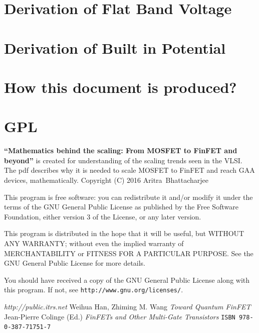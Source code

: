 \documentclass[a4paper]{article}
\begin{document}
\pagebreak

\begin{appendices}
  \section{Derivation of Flat Band Voltage}
  \section{Derivation of Built in Potential}
  \section{How this document is produced?}
  \section{GPL}

  \textbf{``Mathematics behind the scaling: From MOSFET to FinFET and beyond''} is created for understanding of the scaling trends seen in the VLSI. The pdf describes why it is needed to scale MOSFET to FinFET and reach GAA devices, mathematically.
  Copyright (C) 2016 Aritra~Bhattacharjee

  This program is free software: you can redistribute it and/or modify it under the terms of the GNU General Public License as published by the Free Software Foundation, either version 3 of the License, or any later version.

  This program is distributed in the hope that it will be useful, but WITHOUT ANY WARRANTY; without even the implied warranty of MERCHANTABILITY or FITNESS FOR A PARTICULAR PURPOSE. See the GNU General Public License for more details.

  You should have received a copy of the GNU General Public License along with this program.  If not, see \texttt{http://www.gnu.org/licenses/}.

\end{appendices}

\pagebreak

\begin{thebibliography}{10}
  \emph{http://public.itrs.net}
  Weihua Han, Zhiming M. Wang \emph{Toward Quantum FinFET}
  Jean-Pierre Colinge (Ed.) \emph{FinFETs and Other Multi-Gate Transistors} \texttt{ISBN 978-0-387-71751-7}
\end{thebibliography}
\end{document}
